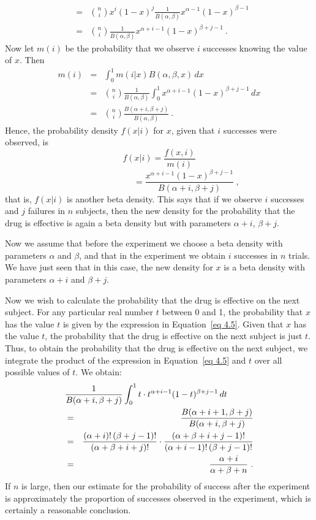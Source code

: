 \begin{example}
\begin{eqnarray*}
       & = & {n \choose i} x^i(1 - x)^j \frac 1{B(\alpha,\beta)} x^{\alpha - 1}(1 -
x)^{\beta - 1} \\
       & = & {n \choose i}  \frac 1{B(\alpha,\beta)} x^{\alpha + i - 1}(1 - x)^{\beta +
j - 1}\ .
\end{eqnarray*}
Now let $m(i)$ be the probability that we observe $i$ successes 
knowing the value of $x$.  Then
\begin{eqnarray*}
m(i) & = & \int_0^1 m(i|x) B(\alpha,\beta,x)\,dx \\
     & = & {n \choose i} \frac 1{B(\alpha,\beta)} \int_0^1 x^{\alpha + i - 1}(1 -
x)^{\beta + j - 1}\,dx \\
     & = & {n \choose i} \frac {B(\alpha + i,\beta + j)}{B(\alpha,\beta)}\ .
\end{eqnarray*}
Hence, the probability density $f(x|i)$ for $x$, given that $i$ successes were
observed, is
$$
f(x|i)  =  \frac {f(x,i)}{m(i)} 
$$
\begin{equation}
\ \ \ \ \ \ \ \ \ \ \ \ \ \ \ \ \ \ \ \ \ \ \ \ \ \ \ \ \ =  
\frac {x^{\alpha + i - 1}(1 - x)^{\beta + j - 1}}{B(\alpha + i,\beta
+ j)}\ ,\label{eq 4.5}
\end{equation}
that is, $f(x|i)$ is another beta density.  This says that if we observe $i$
successes and $j$ failures in $n$ subjects, then the new density for the
probability that the drug is effective is again a beta density but with
parameters $\alpha + i$, $\beta + j$.
\par
Now we assume that before the experiment we choose a beta density with
parameters $\alpha$ and $\beta$, and that in the experiment
we obtain $i$ successes in $n$ trials.  We have just seen that in this case, the new density for $x$
is a beta density with parameters $\alpha + i$ and $\beta + j$.  
\par
Now we wish to calculate the probability that the drug is effective on the next subject.  For any
particular real number $t$ between 0 and 1, the probability that $x$ has the value $t$ is given by
the expression in Equation~\ref{eq 4.5}.  Given that $x$ has the value $t$, the probability that the drug
is effective on the next subject is just $t$.  Thus, to obtain the probability that the drug is effective
on the next subject, we integrate the product of the expression in Equation~\ref{eq 4.5} and $t$ over all
possible values of $t$.  We obtain:
\begin{eqnarray*}
\lefteqn{\frac 1{B(\alpha + i,\beta + j)} 
\int_0^1 t\cdot t^{\alpha + i - 1}(1 - t)^{\beta + j - 1}\,dt}
\\
  & = & \frac {B(\alpha + i + 1,\beta + j)}{B(\alpha + i,\beta + j)} \\
  & = & \frac {(\alpha + i)!\,(\beta + j - 1)!}{(\alpha + \beta + i + j)!} \cdot 
\frac {(\alpha + \beta + i + j - 1)!}{(\alpha + i - 1)!\,(\beta + j - 1)!} \\
  & = & \frac {\alpha + i}{\alpha + \beta + n}\ .
\end{eqnarray*}
If $n$ is large, then our estimate for the probability of success after the experiment is
approximately the proportion of successes observed in the experiment, which is
certainly a reasonable conclusion.
\end{example}

